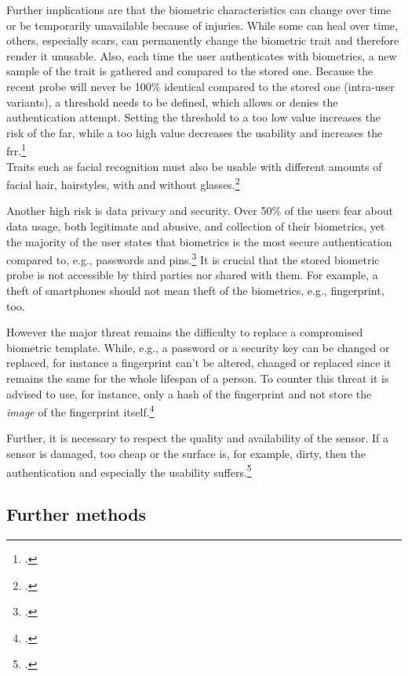 Further implications are that the biometric characteristics can change over time or be temporarily unavailable because of injuries. While some can heal over time, others, especially scars, can permanently change the biometric trait and therefore render it unusable. Also, each time the user authenticates with biometrics, a new sample of the trait is gathered and compared to the stored one. Because the recent probe will never be 100\% identical compared to the stored one (\frqq intra-user variants\flqq), a threshold needs to be defined, which allows or denies the authentication attempt. Setting the threshold to a too low value increases the risk of the \gls{far}, while a too high value decreases the usability and increases the \gls{frr}.\footcite[See][13--17, 52]{Jain2011}\\Traits such as facial recognition must also be usable with different amounts of facial hair, hairstyles, with and without glasses.\footcite[See][98]{Jain2011}

Another high risk is data privacy and security. Over 50\% of the users fear about data usage, both legitimate and abusive, and collection of their biometrics, yet the majority of the user states that biometrics is the most secure authentication compared to, e.g., passwords and \glspl{pin}.\footcite[See][8]{ibm-security} It is crucial that the stored biometric probe is not accessible by third parties nor shared with them. For example, a theft of smartphones should not mean theft of the biometrics, e.g., fingerprint, too.

However the major threat remains the difficulty to replace a compromised biometric template. While, e.g., a password or a security key can be changed or replaced, for instance a fingerprint can't be altered, changed or replaced since it remains the same for the whole lifespan of a person. To counter this threat it is advised to use, for instance, only a hash of the fingerprint and not store the \textit{image} of the fingerprint itself.\footcite[See][266]{shostack2014threat}

Further, it is necessary to respect the quality and availability of the sensor. If a sensor is damaged, too cheap or the surface is, for example, dirty, then the authentication and especially the usability suffers.\footcite[See][37]{265831}

\subsection{Further methods}

